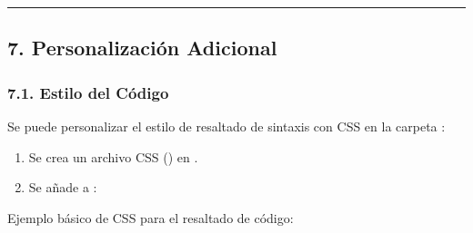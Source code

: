 \documentclass[a4paper,10pt,spanish]{sphinxmanual}
\begin{document}
\begin{sphinxVerbatim}[commandchars=\\\{\}]
 \PYGZbs{}\PYGZbs{}\PYGZbs{}
\end{sphinxVerbatim}


\bigskip\hrule\bigskip



\subsection{7. Personalización Adicional}
\label{\detokenize{configuracion_inicial/003.Creacion_proyecto_Sphinx:personalizacion-adicional}}

\subsubsection{7.1. Estilo del Código}
\label{\detokenize{configuracion_inicial/003.Creacion_proyecto_Sphinx:estilo-del-codigo}}
\sphinxAtStartPar
Se puede personalizar el estilo de resaltado de sintaxis con CSS en la carpeta :
\begin{enumerate}
%
\item {} 
\sphinxAtStartPar
Se crea un archivo CSS () en .

\item {} 
\sphinxAtStartPar
Se añade a :

\end{enumerate}

\begin{sphinxVerbatim}[commandchars=\\\{\}]
  \PYG{p}{[}\PYG{p}{]}
\end{sphinxVerbatim}

\sphinxAtStartPar
Ejemplo básico de CSS para el resaltado de código:

\begin{sphinxVerbatim}[commandchars=\\\{\}]
 
     
     
     
     
     
       
\end{sphinxVerbatim}
\end{document}
